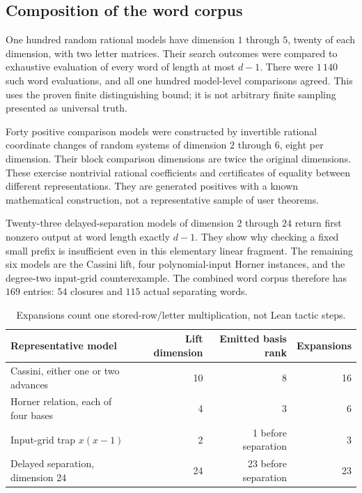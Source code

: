 \subsection{Composition of the word corpus}

One hundred random rational models have dimension $1$ through $5$, twenty of
each dimension, with two letter matrices. Their search outcomes were compared
to exhaustive evaluation of every word of length at most $d-1$. There were
$1\,140$ such word evaluations, and all one hundred model-level comparisons
agreed. This uses the proven finite distinguishing bound; it is not arbitrary
finite sampling presented as universal truth.

Forty positive comparison models were constructed by invertible rational
coordinate changes of random systems of dimension $2$ through $6$, eight per
dimension. Their block comparison dimensions are twice the original dimensions.
These exercise nontrivial rational coefficients and certificates of equality
between different representations. They are generated positives with a known
mathematical construction, not a representative sample of user theorems.

Twenty-three delayed-separation models of dimension $2$ through $24$ return
first nonzero output at word length exactly $d-1$. They show why checking a
fixed small prefix is insufficient even in this elementary linear fragment.
The remaining six models are the Cassini lift, four polynomial-input Horner
instances, and the degree-two input-grid counterexample. The combined word
corpus therefore has $169$ entries: $54$ closures and $115$ actual separating
words.

\begin{table}[ht]
\centering\small
\begin{tabular}{@{}lrrr@{}}
\toprule
Representative model & Lift dimension & Emitted basis rank & Expansions\\
\midrule
Cassini, either one or two advances & 10 & 8 & 16\\
Horner relation, each of four bases & 4 & 3 & 6\\
Input-grid trap $x(x-1)$ & 2 & 1 before separation & 3\\
Delayed separation, dimension 24 & 24 & 23 before separation & 23\\
\bottomrule
\end{tabular}
\caption{Expansions count one stored-row/letter multiplication, not Lean tactic steps.}
\end{table}

